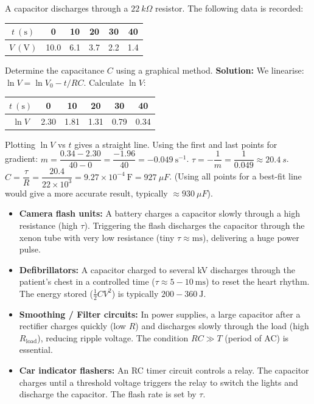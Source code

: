 \documentclass[11pt]{article}
\newcounter{popsec}
\newcounter{popsub}
\newcommand{\courssub}[1]{%
  \stepcounter{popsub}%
  \par\vspace{9pt}\noindent{\popxbold\fontsize{11.5}{13}\selectfont\color{popink}{\color{poporange}\thepopsec.\thepopsub}\hspace{6pt}#1}\par\nopagebreak\vspace{4pt}
}
\begin{document}
\begin{exoresolu}
A capacitor discharges through a $\SI{22}{k\Omega}$ resistor. The following data is recorded:
\begin{center}
\begin{tabular}{|c|c|c|c|c|c|}\hline
$t\ (\mathrm{s})$ & 0 & 10 & 20 & 30 & 40 \\ \hline
$V\ (\mathrm{V})$ & 10.0 & 6.1 & 3.7 & 2.2 & 1.4 \\ \hline
\end{tabular}
\end{center}
Determine the capacitance $C$ using a graphical method.
\tcblower
\textbf{Solution:}
We linearise: $\ln V = \ln V_0 - t/RC$.
Calculate $\ln V$:
\begin{center}
\begin{tabular}{|c|c|c|c|c|c|}\hline
$t\ (\mathrm{s})$ & 0 & 10 & 20 & 30 & 40 \\ \hline
$\ln V$ & 2.30 & 1.81 & 1.31 & 0.79 & 0.34 \\ \hline
\end{tabular}
\end{center}
Plotting $\ln V$ vs $t$ gives a straight line. Using the first and last points for gradient:
$m = \dfrac{0.34 - 2.30}{40 - 0} = \dfrac{-1.96}{40} = -0.049\ \mathrm{s^{-1}}$.
$\tau = -\dfrac{1}{m} = \dfrac{1}{0.049} \approx \SI{20.4}{s}$.
$C = \dfrac{\tau}{R} = \dfrac{20.4}{22 \times 10^3} = 9.27 \times 10^{-4}\ \mathrm{F} = \SI{927}{\mu F}$.
(Using all points for a best-fit line would give a more accurate result, typically $\approx \SI{930}{\mu F}$).
\end{exoresolu}

\courssub{Applications of RC circuits}

\begin{savaistu}
\begin{itemize}
    \item \textbf{Camera flash units:} A battery charges a capacitor slowly through a high resistance (high $\tau$). Triggering the flash discharges the capacitor through the xenon tube with very low resistance (tiny $\tau \approx \mathrm{ms}$), delivering a huge power pulse.
    \item \textbf{Defibrillators:} A capacitor charged to several kV discharges through the patient's chest in a controlled time ($\tau \approx 5-10\ \mathrm{ms}$) to reset the heart rhythm. The energy stored ($\frac{1}{2}CV^2$) is typically $200-360\ \mathrm{J}$.
    \item \textbf{Smoothing / Filter circuits:} In power supplies, a large capacitor after a rectifier charges quickly (low $R$) and discharges slowly through the load (high $R_{\text{load}}$), reducing ripple voltage. The condition $RC \gg T$ (period of AC) is essential.
    \item \textbf{Car indicator flashers:} An RC timer circuit controls a relay. The capacitor charges until a threshold voltage triggers the relay to switch the lights and discharge the capacitor. The flash rate is set by $\tau$.
\end{itemize}
\end{savaistu}
\end{document}
